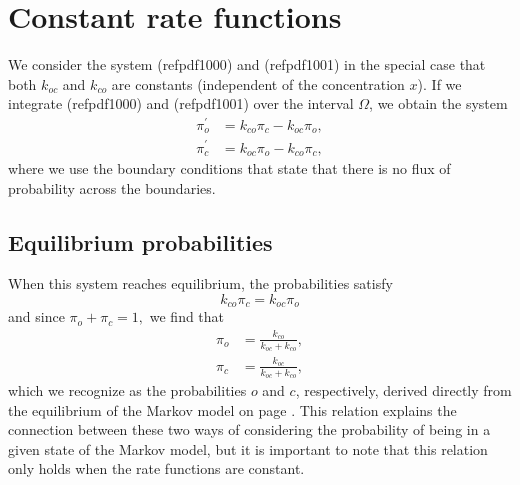 \section{Constant rate functions}
We consider the system (ref{pdf1000}) and (ref{pdf1001}) in the
special case that both $k_{oc}$ and $k_{co}$ are constants (independent of the concentration $x$). If we integrate
(ref{pdf1000}) and (ref{pdf1001}) over the interval $\Omega$, we obtain the system
\begin{align}
\pi_{o}^{\prime}  &  =k_{co}\pi_{c}-k_{oc}\pi_{o},\label{pi1}\\
\pi_{c}^{\prime}  &  =k_{oc}\pi_{o}-k_{co}\pi_{c}, \label{pi2}
\end{align}
where we use the boundary conditions that state that there is no flux
of probability across the boundaries.

\subsection{Equilibrium probabilities}


When this system reaches equilibrium, the probabilities satisfy
\begin{equation}
k_{co}\pi_{c}=k_{oc}\pi_{o}
\end{equation}
and since $\pi_{o}+\pi_{c}=1,$ we find that
\begin{align}
\pi_{o} &  =\frac{k_{co}}{k_{oc}+k_{co}},\label{eq_po}\\
\pi_{c} &  =\frac{k_{oc}}{k_{oc}+k_{co}},\label{eq_pc}
\end{align}
which we recognize as the probabilities $o$ and $c$, respectively, derived directly from the
equilibrium of the Markov model on page \pageref{eq_pr_wt}. This relation explains
the connection between these two ways of considering the probability of
being in a given state of the Markov model, but it is important to note that
this relation only holds when the rate functions are constant.

